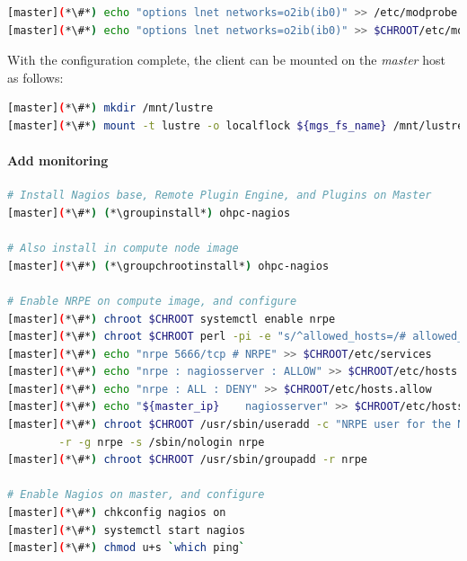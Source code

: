 \documentclass[letterpaper]{article}
\newcommand{\groupinstall}{yum -y groupinstall}
\newcommand{\groupchrootinstall}{yum -y --installroot=\$CHROOT groupinstall}
\begin{document}
\begin{lstlisting}[language=bash,keywords={},upquote=true]
[master](*\#*) echo "options lnet networks=o2ib(ib0)" >> /etc/modprobe.d/lustre.conf
[master](*\#*) echo "options lnet networks=o2ib(ib0)" >> $CHROOT/etc/modprobe.d/lustre.conf
\end{lstlisting}

With the \Lustre{} configuration complete, the client can be mounted on the {\em master}
host as follows:
\begin{lstlisting}[language=bash,keywords={},upquote=true]
[master](*\#*) mkdir /mnt/lustre
[master](*\#*) mount -t lustre -o localflock ${mgs_fs_name} /mnt/lustre
\end{lstlisting}


\paragraph{Add \Nagios{} monitoring}



\begin{lstlisting}[language=bash,keywords={},upquote=true]
# Install Nagios base, Remote Plugin Engine, and Plugins on Master
[master](*\#*) (*\groupinstall*) ohpc-nagios

# Also install in compute node image
[master](*\#*) (*\groupchrootinstall*) ohpc-nagios

# Enable NRPE on compute image, and configure
[master](*\#*) chroot $CHROOT systemctl enable nrpe
[master](*\#*) chroot $CHROOT perl -pi -e "s/^allowed_hosts=/# allowed_hosts=/" /etc/nagios/nrpe.cfg
[master](*\#*) echo "nrpe 5666/tcp # NRPE" >> $CHROOT/etc/services
[master](*\#*) echo "nrpe : nagiosserver : ALLOW" >> $CHROOT/etc/hosts.allow
[master](*\#*) echo "nrpe : ALL : DENY" >> $CHROOT/etc/hosts.allow
[master](*\#*) echo "${master_ip}    nagiosserver" >> $CHROOT/etc/hosts
[master](*\#*) chroot $CHROOT /usr/sbin/useradd -c "NRPE user for the NRPE service" -d /var/run/nrpe \
        -r -g nrpe -s /sbin/nologin nrpe
[master](*\#*) chroot $CHROOT /usr/sbin/groupadd -r nrpe

# Enable Nagios on master, and configure
[master](*\#*) chkconfig nagios on
[master](*\#*) systemctl start nagios
[master](*\#*) chmod u+s `which ping`
\end{lstlisting}
\end{document}
